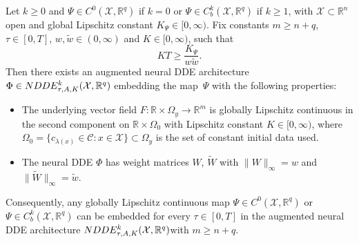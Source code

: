 \documentclass[10pt,a4paper]{amsart}
\newcommand\normm[1]{\big\lVert#1\big\lVert}
\begin{document}
	\begin{theorem} \label{th:universalaugmented}
		Let $k \geq 0$ and $\Psi\in C^0(\mathcal{X}, \mathbb{R}^q)$ if $k = 0$ or $\Psi\in C^k_b(\mathcal{X},\mathbb{R}^q)$ if $k\geq 1$, with $\mathcal{X}\subset \mathbb{R}^n$ open and global Lipschitz constant $K_\Psi\in[0,\infty)$. Fix constants $m \geq n+q$, $\tau \in [0,T]$, $w,\tilde w\in (0,\infty)$ and $K \in [0,\infty)$, such that $$K T \geq \frac{K_\Psi}{w \tilde{w}}.$$ Then there exists an augmented neural DDE architecture $\Phi \in \textup{NDDE}_{\tau,\textup{A},K}^k(\mathcal{X},\mathbb{R}^q)$  embedding the map~$\Psi$ with the following properties:
		\begin{itemize}
			\item The underlying vector field $F: \mathbb{R}\times \Omega_y\rightarrow \mathbb{R}^m$  is globally Lipschitz continuous in the second component on $\mathbb{R}\times \Omega_0$  with Lipschitz constant $K\in[0,\infty)$, where $\Omega_0 = \{c_{\lambda(x)}\in\mathcal{C}: x\in\mathcal{X}\}\subset \Omega_y$ is the set of constant initial data used.
			\item The neural DDE $\Phi$ has weight matrices $W$, $\widetilde{W}$ with $\normm{W}_\infty = w$ and $\normm{\widetilde{W}}_\infty = \tilde w$.
		\end{itemize}
		Consequently, any globally Lipschitz continuous map $\Psi\in C^0(\mathcal{X},\mathbb{R}^q)$ or $\Psi\in  C^k_b(\mathcal{X},\mathbb{R}^q)$ can be embedded for every $\tau \in [0,T]$ in the augmented neural DDE architecture $\textup{NDDE}^k_{\tau,\textup{A},K}(\mathcal{X},\mathbb{R}^q)$with $m \geq n+q$.
	\end{theorem}
\end{document}
